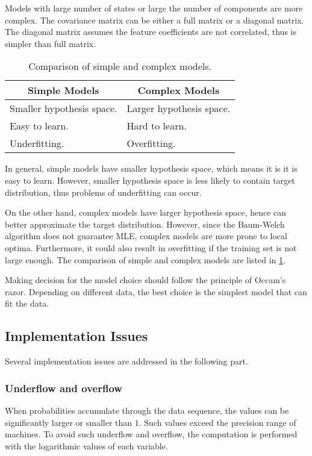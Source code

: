 \documentclass[12pt,final,twoside]{report}
\begin{document}
Models with large number of states or large the number of components are more complex. The covariance matrix can be either a full matrix or a diagonal matrix. The diagonal matrix assumes the feature coefficients are not correlated, thus is simpler than full matrix.

\begin{table}[t]
  \caption{Comparison of simple and complex models.}
  \label{tab:model}
  \centering
  \begin{tabular}{p{}p{}}
    \toprule
    \multicolumn{1}{c}{\bfseries Simple Models} & \multicolumn{1}{c}{\bfseries Complex Models} \\ \midrule
    Smaller hypothesis space. & Larger hypothesis space. \\
    Easy to learn. & Hard to learn. \\
    Underfitting. & Overfitting. \\
    \bottomrule
  \end{tabular}
\end{table}

In general, simple models have smaller hypothesis space, which means it is it is easy to learn. However, smaller hypothesis space is less likely to contain target distribution, thus problems of underfitting can occur.

On the other hand, complex models have larger hypothesis space, hence can better approximate the target distribution. However, since the Baum-Welch algorithm does not guarantee MLE, complex models are more prone to local optima. Furthermore, it could also result in overfitting if the training set is not large enough. The comparison of simple and complex models are listed in \cref{tab:model}.

Making decision for the model choice should follow the principle of Occam's razor. Depending on different data, the best choice is the simplest model that can fit the data.

\subsection{Implementation Issues}
Several implementation issues are addressed in the following part.

\subsubsection{Underflow and overflow}

When probabilities accumulate through the data sequence, the values can be significantly larger or smaller than $1$. Such values exceed the precision range of machines. To avoid such underflow and overflow, the computation is performed with the logarithmic values of each variable. 
\end{document}
